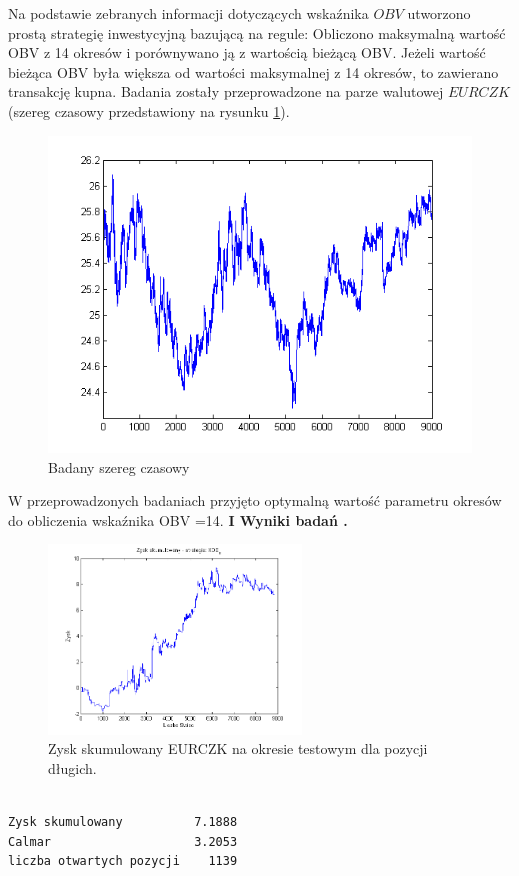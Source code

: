 \documentclass[12pt,a4paper]{article}
\begin{document}
Na podstawie zebranych informacji dotyczących wskaźnika $OBV$ utworzono prostą strategię inwestycyjną bazującą na regule: Obliczono maksymalną wartość OBV z 14 okresów i porównywano ją z wartością bieżącą OBV. Jeżeli wartość bieżąca OBV była większa od wartości maksymalnej z 14 okresów, to zawierano transakcję kupna. Badania zostały przeprowadzone na parze walutowej $EURCZK$ (szereg czasowy przedstawiony na rysunku \ref{rysunek2}). \\
\begin{figure}[h!]
\centering
\includegraphics[width = \textwidth]{podzialDanych.png}
\caption{Badany szereg czasowy}
\label{rysunek2}
\end{figure}
\FloatBarrier
W przeprowadzonych badaniach przyjęto optymalną wartość parametru okresów do obliczenia wskaźnika OBV =14.
\newpage
\noindent \textbf{I Wyniki badań .}\\
\begin{figure}[h!]
\centering
\includegraphics[width = 0.6\textwidth]{ROC_EURJPY_LS_SearchBestK_zysk.png}
\caption{Zysk skumulowany EURCZK na okresie testowym dla pozycji długich. }
\end{figure}
\FloatBarrier
\begin{verbatim}

Zysk skumulowany          7.1888
Calmar                    3.2053
liczba otwartych pozycji    1139





\end{verbatim}
\end{document}
